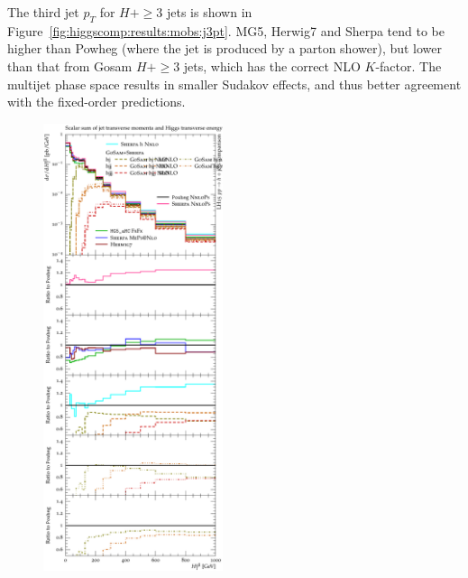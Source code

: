The third jet $p_T$ for $H+\ge3$ jets is shown in
Figure~\ref{fig:higgscomp:results:mobs:j3pt}. MG5, Herwig7 and Sherpa
tend to be higher than Powheg (where the jet is produced by a parton
shower), but lower than that from Gosam $H+\ge3$ jets, which has the
correct NLO $K$-factor. The multijet phase space results in smaller
Sudakov effects, and thus better agreement with the fixed-order
predictions.

\begin{figure}[t!]
  \centering
  \includegraphics[width=0.47\textwidth]{figures/hjetscomp_u_HT_all.pdf}
  \hfill

\end{figure}
